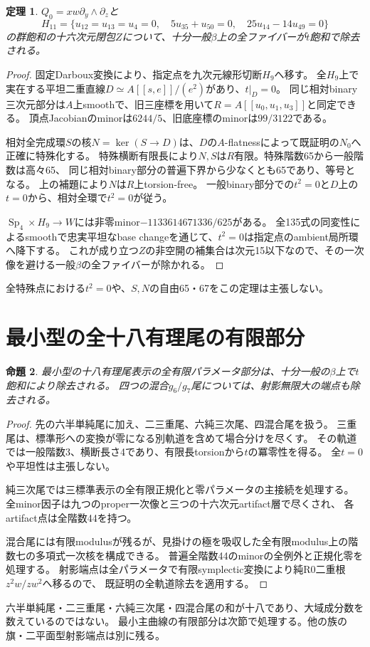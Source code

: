 \documentclass[11pt,a4paper]{ltjsarticle}
\DeclareMathOperator{\Sp}{Sp}
\newtheorem{theorem}{定理}[section]
\newtheorem{proposition}[theorem]{命題}
\theoremstyle{remark}
\begin{document}
\begin{theorem}
$Q_0=xw\partial_y\wedge\partial_z$と
\[
 H_{11}=\{u_{12}=u_{13}=u_4=0,\quad5u_{35}+u_{50}=0,
                  \quad25u_{14}-14u_{49}=0\}
\]
の群飽和の十六次元閉包$Z$について、十分一般$\beta$上の全ファイバーが$t$飽和で除去される。
\end{theorem}
\begin{proof}
固定Darboux変換により、指定点を九次元線形切断$H_9$へ移す。
全$H_9$上で実在する平坦二重直線$D\simeq A[[s,e]]/(e^2)$があり、$t|_D=0$。
同じ相対binary三次元部分は$A$上smoothで、旧三座標を用いて$R=A[[u_0,u_1,u_3]]$と同定できる。
頂点Jacobianのminorは$6244/5$、旧底座標のminorは$99/3122$である。

相対全完成環$S$の核$N=\ker(S\to D)$は、$D$の$A$-flatnessによって既証明の$N_0$へ正確に特殊化する。
特殊横断有限長により$N,S$は$R$有限。特殊階数65から一般階数は高々65、
同じ相対binary部分の普遍下界から少なくとも65であり、等号となる。
上の補題により$N$は$R$上torsion-free。
一般binary部分での$t^2=0$と$D$上の$t=0$から、相対全環で$t^2=0$が従う。

$\Sp_4\times H_9\to W$には非零minor$-1133614671336/625$がある。
全135式の同変性によるsmoothで忠実平坦なbase changeを通じて、$t^2=0$は指定点のambient局所環へ降下する。
これが成り立つ$Z$の非空開の補集合は次元15以下なので、その一次像を避ける一般$\beta$の全ファイバーが除かれる\cite{binary-mixed-stratum-v40}。
\end{proof}
全特殊点における$t^2=0$や、$S,N$の自由65・67をこの定理は主張しない。



\section{最小型の全十八有理尾の有限部分}
\begin{proposition}
最小型の十八有理尾表示の全有限パラメータ部分は、十分一般の$\beta$上で$t$飽和により除去される。
四つの混合$g_6/g_7$尾については、射影無限大の端点も除去される。
\end{proposition}
\begin{proof}
先の六半単純尾に加え、二三重尾、六純三次尾、四混合尾を扱う。
三重尾は、標準形への変換が零になる別軌道を含めて場合分けを尽くす。
その軌道では一般階数3、横断長さ4であり、有限長torsionから$t$の冪零性を得る。
全$t=0$や平坦性は主張しない\cite{minimal-triple-v40}。

純三次尾では三標準表示の全有限正規化と零パラメータの主接続を処理する。
全minor因子は九つのproper一次像と三つの十六次元artifact層で尽くされ、
各artifact点は全階数44を持つ\cite{minimal-pure-v40}。

混合尾には有限modulusが残るが、見掛けの極を吸収した全有限modulus上の階数七の多項式一次核を構成できる。
普遍全階数44のminorの全例外と正規化零を処理する。
射影端点は全パラメータで有限symplectic変換により純R0二重根$z^2w/zw^2$へ移るので、
既証明の全軌道除去を適用する\cite{minimal-mixed-v40}。
\end{proof}
六半単純尾・二三重尾・六純三次尾・四混合尾の和が十八であり、大域成分数を数えているのではない。
最小主曲線の有限部分は次節で処理する。他の族の旗・二平面型射影端点は別に残る。
\end{document}
